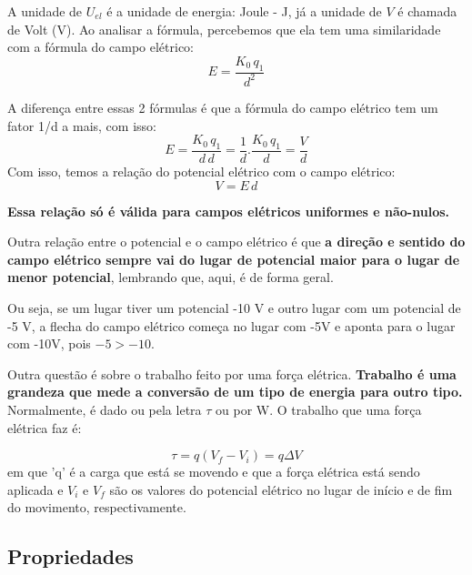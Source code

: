 \documentclass[12pt]{extarticle}
\newcommand{\<}{\langle}
\renewcommand{\>}{\rangle}
\theoremstyle{definition}
\begin{document}
A unidade de $U_{el}$ é a unidade de energia: Joule - J, já a unidade de $V$ é chamada de Volt (V). Ao analisar a fórmula, percebemos que ela tem uma similaridade com a fórmula do campo elétrico:
\begin{equation}
    E=\frac{K_0\,q_1}{d^2}
\end{equation}

A diferença entre essas 2 fórmulas é que a fórmula do campo elétrico tem um fator 1/d a mais, com isso:
\begin{equation}
    E = \frac{K_0\,q_1}{d\,d} = \frac{1}{d}.\frac{K_0\,q_1}{d} = \frac{V}{d}
\end{equation}
Com isso, temos a relação do potencial elétrico com o campo elétrico:
\begin{equation}
    \boxed{V = E\,d}
\end{equation}

\textbf{Essa relação só é válida para campos elétricos uniformes e não-nulos.}

Outra relação entre o potencial e o campo elétrico é que \textbf{a direção e sentido do campo elétrico sempre vai do lugar de potencial maior para o lugar de menor potencial}, lembrando que, aqui, é de forma geral. 

Ou seja, se um lugar tiver um potencial -10 V e outro lugar com um potencial de -5 V, a flecha do campo elétrico começa no lugar com -5V e aponta para o lugar com -10V, pois $-5 > -10$.

Outra questão é sobre o trabalho feito por uma força elétrica. \textbf{Trabalho é uma grandeza que mede a conversão de um tipo de energia para outro tipo.} Normalmente, é dado ou pela letra $\tau$ ou por W. O trabalho que uma força elétrica faz é:

\begin{equation}
    \tau = q(V_f - V_i) = q\Delta V
\end{equation}
\noindent em que 'q' é a carga que está se movendo e que a força elétrica está sendo aplicada e $V_i$ e $V_f$ são os valores do potencial elétrico no lugar de início e de fim do movimento, respectivamente.
\subsection{Propriedades}
\end{document}
